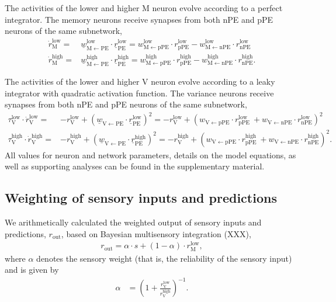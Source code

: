 \documentclass[10pt,a4paper,draft]{article}
\begin{document}
The activities of the lower and higher M neuron evolve according to a perfect integrator. The memory neurons receive synapses from both nPE and pPE neurons of the same subnetwork,
%
\begin{align}
\dot{r}_\mathrm{M}^\mathrm{low} =& \underline{w}_\mathrm{M \leftarrow PE}^\mathrm{low} \cdot \underline{r}_\mathrm{PE}^\mathrm{low} = w_\mathrm{M \leftarrow pPE}^\mathrm{low} \cdot r_\mathrm{pPE}^\mathrm{low} - w_\mathrm{M \leftarrow nPE}^\mathrm{low} \cdot r_\mathrm{nPE}^\mathrm{low} \nonumber \\
%
\dot{r}_\mathrm{M}^\mathrm{high} =& \underline{w}_\mathrm{M \leftarrow PE} ^\mathrm{high} \cdot \underline{r}_\mathrm{PE}^\mathrm{high} = w_\mathrm{M \leftarrow pPE}^\mathrm{high}  \cdot r_\mathrm{pPE}^\mathrm{high} - w_\mathrm{M \leftarrow nPE}^\mathrm{high}  \cdot r_\mathrm{nPE}^\mathrm{high} .
\end{align}
%

The activities of the lower and higher V neuron evolve according to a leaky integrator with quadratic activation function. The variance neurons receive synapses from both nPE and pPE neurons of the same subnetwork,
%
\begin{align}
\tau_\mathrm{V}^\mathrm{low} \cdot \dot{r}_\mathrm{V}^\mathrm{low} =& - r_\mathrm{V}^\mathrm{low} + \left( \underline{w}_\mathrm{V \leftarrow PE} \cdot \underline{r}_\mathrm{PE}^\mathrm{low}\right)^2 = - r_\mathrm{V}^\mathrm{low} + \left( w_\mathrm{V \leftarrow pPE} \cdot r_\mathrm{pPE}^\mathrm{low}\ + w_\mathrm{V \leftarrow nPE} \cdot r_\mathrm{nPE}^\mathrm{low}\right)^2 \nonumber\\
%
\tau_\mathrm{V}^\mathrm{high} \cdot \dot{r}_\mathrm{V}^\mathrm{high} =& - r_\mathrm{V}^\mathrm{high} + \left( \underline{w}_\mathrm{V \leftarrow PE} \cdot \underline{r}_\mathrm{PE}^\mathrm{high}\right)^2 = - r_\mathrm{V}^\mathrm{high} + \left( w_\mathrm{V \leftarrow pPE} \cdot r_\mathrm{pPE}^\mathrm{high}\ + w_\mathrm{V \leftarrow nPE} \cdot r_\mathrm{nPE}^\mathrm{high}\right)^2.
\end{align} 
%
All values for neuron and network parameters, details on the model equations, as well as supporting analyses can be found in the supplementary material.

\subsection*{Weighting of sensory inputs and predictions}
%
We arithmetically calculated the weighted output of sensory inputs and predictions, $r_\mathrm{out}$, based on Bayesian multisensory integration (XXX),
%
\begin{align}
r_\mathrm{out} = \alpha \cdot s + (1-\alpha) \cdot r_\mathrm{M}^\mathrm{low},
\end{align}
%
where $\alpha$ denotes the sensory weight (that is, the reliability of the sensory input) and is given by 
%
\begin{align}
\alpha &= \left( 1 + \frac{r_\mathrm{V}^\mathrm{low}}{r_\mathrm{V}^\mathrm{high}} \right)^{-1}.
\end{align}
\end{document}
